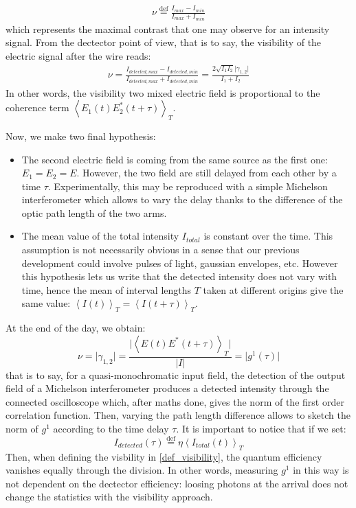 \documentclass[12pt]{report}
\begin{document}
\begin{align}
\label{def_visibility}
\nu \stackrel{\text{def}}{=} \frac{I_{max} - I_{min}}{I_{max} + I_{min}}
\end{align}
which represents the maximal contrast that one may observe for an intensity signal. From the dectector point of view, that is to say, the visibility of the electric signal after the wire reads:
\begin{align}
\nu = \frac{I_{detected, max} - I_{detected, min}}{I_{detected, max} + I_{detected, min}} = \frac{2\sqrt{I_1 I_2} \vert \gamma_{1,2} \vert}{I_1 + I_2}
\end{align}
In other words, the visibility two mixed electric field is proportional to the coherence term $\left\langle E_1(t) E_2^*(t + \tau) \right\rangle _T$.

Now, we make two final hypothesis:
\begin{itemize}
	\item The second electric field is coming from the same source as the first one: $E_1 = E_2 = E$. However, the two field are still delayed from each other by a time $\tau$. Experimentally, this may be reproduced with a simple Michelson interferometer which allows to vary the delay thanks to the difference of the optic path length of the two arms.
	\item The mean value of the total intensity $I_{total}$ is constant over the time. This assumption is not necessarily obvious in a sense that our previous development could involve pulses of light, gaussian envelopes, etc. However this hypothesis lets us write that the detected intensity does not vary with time, hence the mean of interval lengths $T$ taken at  different origins give the same value: $\left\langle I(t) \right\rangle_T = \left\langle I(t + \tau) \right\rangle _T$.
\end{itemize}
At the end of the day, we obtain:
\begin{equation}
\nu = \vert \gamma_{1, 2} \vert = \frac{\vert\left\langle E(t) E^*(t + \tau) \right\rangle _T\vert}{\vert I \vert} = \vert g^1(\tau) \vert
\end{equation}
that is to say, for a quasi-monochromatic input field, the detection of the output field of a Michelson interferometer produces a detected intensity through the connected oscilloscope which, after maths done, gives the norm of the first order correlation function. Then, varying the path length difference allows to sketch the norm of $g^1$ according to the time delay $\tau$. It is important to notice that if we set:
\begin{equation}
I_{detected}(\tau) \stackrel{\text{def}}{=} \eta \left\langle I_{total}(t) \right\rangle_T
\end{equation}
Then, when defining the visbility in \eqref{def_visibility}, the quantum efficiency vanishes equally through the division. In other words, measuring $g^1$ in this way is not dependent on the dectector efficiency: loosing photons at the arrival does not change the statistics with the visibility approach.
\end{document}
